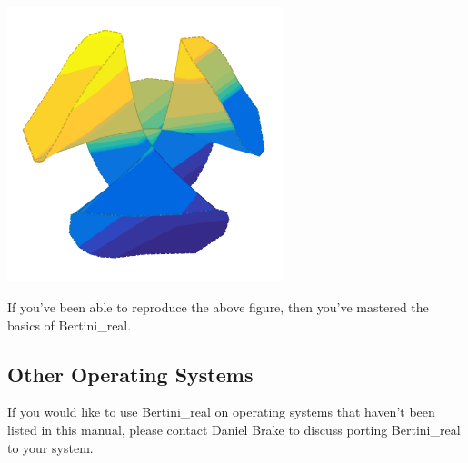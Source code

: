 \begin{center}\begin{minipage}{0.9\linewidth}
\centering
\includegraphics[width=0.6\textwidth]{CayleyCubic}
\end{minipage}\end{center}


If you've been able to reproduce the above figure, then you've mastered the basics of Bertini\_real. 





	\subsection{Other Operating Systems}
If you would like to use Bertini\_real on operating systems that haven't been listed in this manual, please contact Daniel Brake to discuss porting Bertini\_real to your system.


